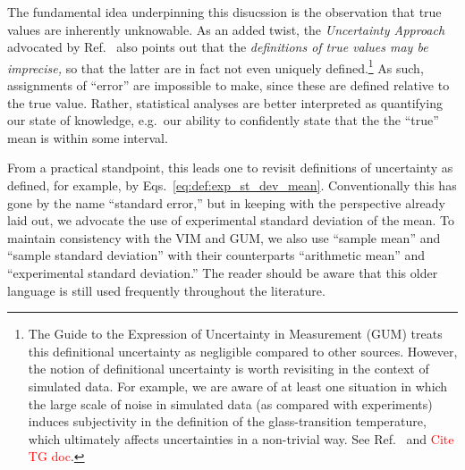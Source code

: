 The fundamental idea underpinning this disucssion is the observation that true values are inherently unknowable.
As an added twist, the {\it Uncertainty Approach} advocated by Ref.~\cite{JCGM:GUM2008} also points out that the {\it definitions of true values may be imprecise,} so that the latter are in fact not even uniquely defined.\footnote{The Guide to the Expression of Uncertainty in Measurement (GUM) treats this definitional uncertainty as negligible compared to other sources.
However, the notion of definitional uncertainty is worth revisiting in the context of simulated data.
For example, we are aware of at least one situation in which the large scale of noise in simulated data (as compared with experiments) induces subjectivity in the definition of the glass-transition temperature, which ultimately affects uncertainties in a non-trivial way.
See Ref.~\cite{Patrone1} and \textcolor{red}{Cite TG doc}.} As such, assignments of ``error'' are impossible to make, since these are defined relative to the true value.
Rather, statistical analyses are better interpreted as quantifying our state of knowledge, e.g.\ our ability to confidently state that the the ``true'' mean is within some interval.

From a practical standpoint, this leads one to revisit definitions of uncertainty as defined, for example, by Eqs.~\eqref{eq:def:exp_st_dev_mean}.
Conventionally this has gone by the name ``standard error,'' but in keeping with the perspective already laid out, we advocate the use of experimental standard deviation of the mean.
To maintain consistency with the VIM and GUM, we also use ``sample mean'' and ``sample standard deviation'' with their counterparts ``arithmetic mean'' and ``experimental standard deviation.''
The reader should be aware that this older language is still used frequently throughout the literature.




